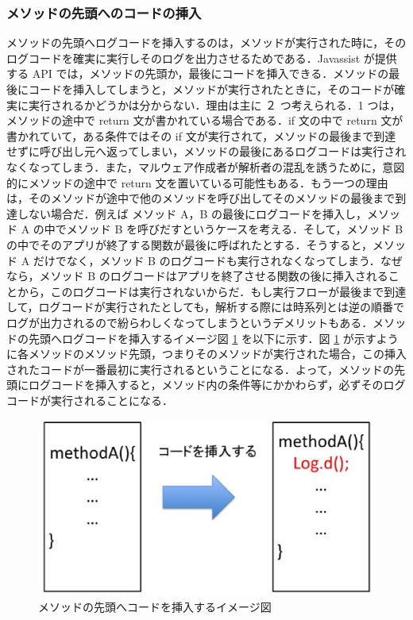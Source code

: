 \subsubsection{メソッドの先頭へのコードの挿入}
 \label{methodtop}
メソッドの先頭へログコードを挿入するのは，メソッドが実行された時に，そのログコードを確実に実行しそのログを出力させるためである．Javassist が提供する API では，メソッドの先頭か，最後にコードを挿入できる．メソッドの最後にコードを挿入してしまうと，メソッドが実行されたときに，そのコードが確実に実行されるかどうかは分からない．理由は主に ２ つ考えられる．1 つは，メソッドの途中で return 文が書かれている場合である．if 文の中で return 文が書かれていて，ある条件ではその if 文が実行されて，メソッドの最後まで到達せずに呼び出し元へ返ってしまい，メソッドの最後にあるログコードは実行されなくなってしまう．また，マルウェア作成者が解析者の混乱を誘うために，意図的にメソッドの途中で return 文を置いている可能性もある．もう一つの理由は，そのメソッドが途中で他のメソッドを呼び出してそのメソッドの最後まで到達しない場合だ．例えば メソッド A，B の最後にログコードを挿入し，メソッド A の中でメソッド B を呼びだすというケースを考える．そして，メソッド B の中でそのアプリが終了する関数が最後に呼ばれたとする．そうすると，メソッド A だけでなく，メソッド B のログコードも実行されなくなってしまう．なぜなら，メソッド B のログコードはアプリを終了させる関数の後に挿入されることから，このログコードは実行されないからだ．もし実行フローが最後まで到達して，ログコードが実行されたとしても，解析する際には時系列とは逆の順番でログが出力されるので紛らわしくなってしまうというデメリットもある．メソッドの先頭へログコードを挿入するイメージ図 \ref{insertbefore} を以下に示す．図 \ref{insertbefore} が示すように各メソッドのメソッド先頭，つまりそのメソッドが実行された場合，この挿入されたコードが一番最初に実行されるということになる．よって，メソッドの先頭にログコードを挿入すると，メソッド内の条件等にかかわらず，必ずそのログコードが実行されることになる．

\begin{figure}[t]
\begin{center}
\includegraphics[scale=0.5]{image2.eps}
\end{center}
\caption{メソッドの先頭へコードを挿入するイメージ図}
\label{insertbefore}
\end{figure}

